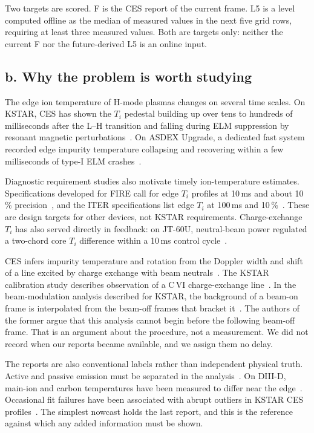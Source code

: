 Two targets are scored. F is the CES report of the current frame. L5 is a level computed offline as the median of measured values in the next five grid rows, requiring at least three measured values. Both are targets only: neither the current F nor the future-derived L5 is an online input.

\subsection*{b. Why the problem is worth studying}
The edge ion temperature of H-mode plasmas changes on several time scales. On KSTAR, CES has shown the $T_i$ pedestal building up over tens to hundreds of milliseconds after the L--H transition and falling during ELM suppression by resonant magnetic perturbations~\citep{Ko2015IonTemperature}. On ASDEX Upgrade, a dedicated fast system recorded edge impurity temperature collapsing and recovering within a few milliseconds of type-I ELM crashes~\citep{Viezzer2018IonHeat}.

Diagnostic requirement studies also motivate timely ion-temperature estimates. Specifications developed for FIRE call for edge $T_i$ profiles at 10\,ms and about 10\,\% precision~\citep{Young2008PlasmaMeasurements}, and the ITER specifications list edge $T_i$ at 100\,ms and 10\,\%~\citep{Donne2007ChapterDiagnostics}. These are design targets for other devices, not KSTAR requirements. Charge-exchange $T_i$ has also served directly in feedback: on JT-60U, neutral-beam power regulated a two-chord core $T_i$ difference within a 10\,ms control cycle~\citep{Yoshida2009RealTime}.

CES infers impurity temperature and rotation from the Doppler width and shift of a line excited by charge exchange with beam neutrals~\citep{Fonck1984DeterminationPlasma}. The KSTAR calibration study describes observation of a C\,VI charge-exchange line~\citep{Ko2010ChargeExchange}. In the beam-modulation analysis described for KSTAR, the background of a beam-on frame is interpolated from the beam-off frames that bracket it~\citep{Lee2020TwoGaussian,Lee2026NeuralNetworkbased}. The authors of the former argue that this analysis cannot begin before the following beam-off frame. That is an argument about the procedure, not a measurement. We did not record when our reports became available, and we assign them no delay.

The reports are also conventional labels rather than independent physical truth. Active and passive emission must be separated in the analysis~\citep{Viezzer2011PassiveEdge}. On DIII-D, main-ion and carbon temperatures have been measured to differ near the edge~\citep{Haskey2018MainIon}. Occasional fit failures have been associated with abrupt outliers in KSTAR CES profiles~\citep{Kim2024KineticProfile}. The simplest nowcast holds the last report, and this is the reference against which any added information must be shown.


